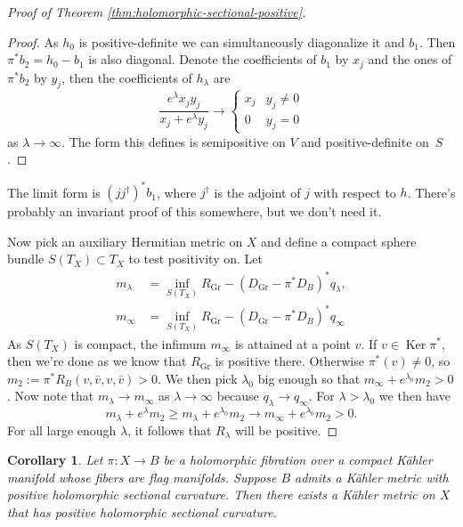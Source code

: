 \documentclass[10pt,a4paper]{amsart}
\newtheorem{coro}[theo]{Corollary}
\theoremstyle{definition}
\DeclareMathOperator{\Gr}{Gr}
\DeclareMathOperator{\Ker}{Ker}
\begin{document}
\begin{proof}[Proof of Theorem \ref{thm:holomorphic-sectional-positive}]
\begin{proof}
As $h_{0}$ is positive-definite we can simultaneously diagonalize it and $b_{1}$.
Then $\pi^{*}b_{2} = h_{0} - b_{1}$ is also diagonal.
Denote the coefficients of $b_{1}$ by $x_{j}$ and the ones of $\pi^{*}b_{2}$ by $y_{j}$, then the coefficients of $h_{\lambda}$ are
\[
  \frac{e^{\lambda}x_{j} y_{j}}{x_{j} + e^{\lambda} y_{j}}
  \to
  \begin{cases}
    x_{j} & y_{j} \not= 0
    \\
    0 & y_{j} = 0
  \end{cases}
\]
as $\lambda \to \infty$.
The form this defines is semipositive on $V$ and positive-definite on~$S$.%
\end{proof}

The limit form is $(j j^{\dagger})^{*}b_{1}$, where $j^{\dagger}$ is the adjoint of $j$ with respect to $h$. There's probably an invariant proof of this somewhere, but we don't need it.

Now pick an auxiliary Hermitian metric on $X$ and define a compact sphere bundle
$S(T_X) \subset T_X$ to test positivity on.
Let
\begin{align*}
m_\lambda &=
\inf_{S(T_X)} R_{\Gr}
- (D_{\Gr} - \pi^* D_{B})^* q_{\lambda},
\\
m_\infty &=
\inf_{S(T_X)} R_{\Gr}
- (D_{\Gr} - \pi^* D_{B})^* q_{\infty}
\end{align*}
As $S(T_X)$ is compact, the infimum $m_\infty$ is attained at a point $v$.
If $v \in \Ker \pi^*$, then we're done as we know that $R_{\Gr}$ is positive
there.
Otherwise $\pi^*(v) \not= 0$, so $m_2 := \pi^*R_B(v, \bar v, v, \bar v) > 0$.
We then pick $\lambda_0$ big enough so that $m_\infty + e^{\lambda_0} m_2 > 0$.
Now note that
$m_\lambda \to m_\infty$ as $\lambda \to \infty$ because $q_{\lambda} \to
q_{\infty}$.
For $\lambda > \lambda_0$ we then have
$$
m_\lambda + e^\lambda m_2
\geq m_\lambda + e^{\lambda_0} m_2
\to m_\infty  + e^{\lambda_0} m_2
> 0.
$$
For all large enough $\lambda$, it follows that $R_\lambda$ will be positive.
\end{proof}



\begin{coro}
Let $\pi : X \to B$ be a holomorphic fibration over a compact K\"ahler manifold whose fibers are flag manifolds.
Suppose $B$ admits a K\"ahler metric with positive holomorphic sectional curvature.
Then there exists a K\"ahler metric on $X$ that has positive holomorphic sectional curvature.
\end{coro}
\end{document}

